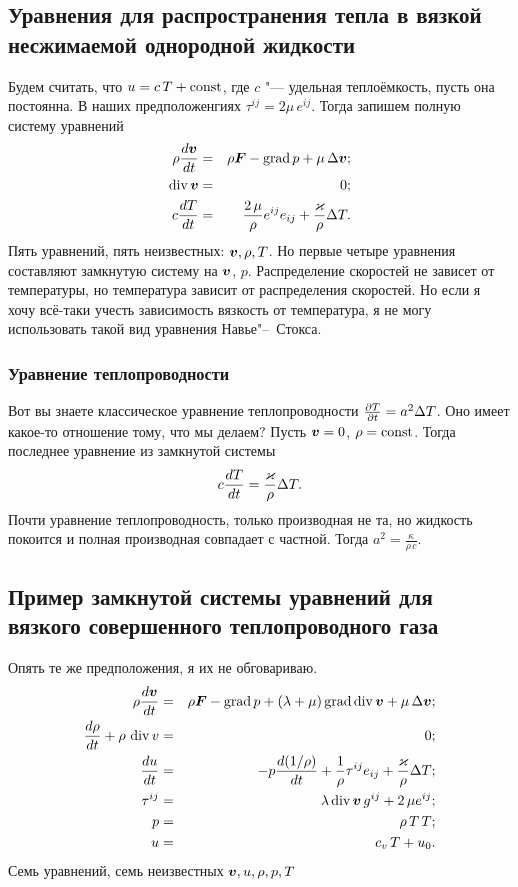 \subsection{Уравнения для распространения тепла в вязкой несжимаемой однородной жидкости}
Будем считать, что $u=c\,T + \operatorname{const}$, где $c$ "--- удельная теплоёмкость, пусть она постоянна. В наших предположенгиях $\tau^{ij} = 2\mu\,e^{ij}$. Тогда запишем полную систему уравнений
\begin{eqnarray*}
  \rho\frac{d\boldsymbol{v}}{dt} &=& \rho\boldsymbol{F} - \operatorname{grad} p + \mu\,\Delta\boldsymbol{v};\\
  \operatorname{div}\boldsymbol{v}&=&0;\\
  c\frac{dT}{dt} &=& \frac{2\,\mu}{\rho}e^{ij}e_{ij} + \frac{\varkappa}\rho\Delta T.
\end{eqnarray*}
Пять уравнений, пять неизвестных: $\boldsymbol{v},\rho,T$. Но первые четыре уравнения составляют замкнутую систему на $\boldsymbol{v}$, $p$. Распределение скоростей не зависет от температуры, но температура зависит от распределения скоростей. Но если я хочу всё-таки учесть зависимость вязкость от температура, я не могу использовать такой вид уравнения Навье"--~Стокса.
\subsubsection{Уравнение теплопроводности}
Вот вы знаете классическое уравнение теплопроводности $\frac{\partial T}{\partial t} = a^2\Delta T$. Оно имеет какое-то отношение тому, что мы делаем? Пусть $\boldsymbol{v}=0$, $\rho=\operatorname{const}$. Тогда последнее уравнение из замкнутой системы
\[
  c\frac{dT}{dt} = \frac{\varkappa}\rho\Delta T.
\]
Почти уравнение теплопроводность, только производная не та, но жидкость покоится и полная производная совпадает с частной. Тогда $a^2 = \frac\kappa{\rho\,c}$.

\subsection{Пример замкнутой системы уравнений для вязкого совершенного теплопроводного газа}
Опять те же предположения, я их не обговариваю.
\begin{eqnarray*}
\rho\frac{d\boldsymbol{v}}{dt} &=& \rho\boldsymbol{F} -\operatorname{grad} p+ (\lambda+\mu)\operatorname{grad}\operatorname{div}\boldsymbol{v} + \mu\,\Delta\boldsymbol{v};\\
\frac{d\rho}{dt} + \rho\,\operatorname{div} v&=&0;\\
\frac{du}{dt} &=& -p\frac{d(1/\rho)}{dt} + \frac1\rho\tau^{ij}e_{ij} + \frac{\varkappa}\rho\Delta T;\\
\tau^{ij} &=& \lambda\operatorname{div}\boldsymbol{v}\,g^{ij} + 2\,\mu e^{ij};\\
p &=& \rho\,T\,T;\\
u &=&c_v\,T + u_0.
\end{eqnarray*}
Семь уравнений, семь неизвестных $\boldsymbol{v},u,\rho,p,T$

